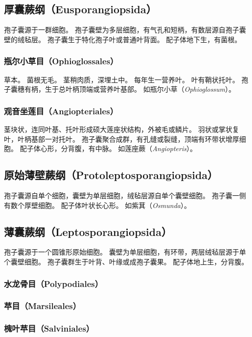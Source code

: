 \documentclass[11pt]{article}
\begin{document}
\begin{sloppypar}
\subsection{厚囊蕨纲（Eusporangiopsida）}
孢子囊源于一群细胞。
孢子囊壁为多层细胞，有气孔和短柄，有数层源自孢子囊壁的绒毡层。
孢子囊生于特化孢子叶或普通叶背面。
配子体地下生，有菌根。

\subsubsection{瓶尔小草目（Ophioglossales）}
草本。
菌根无毛。
茎稍肉质，深埋土中。
每年生一营养叶。
叶有鞘状托叶。
孢子囊穗有柄，生于总叶柄顶端或营养叶基部。
如瓶尔小草（\textit{Ophioglossum}）。

\subsubsection{观音坐莲目（Angiopteriales）}
茎块状，连同叶基、托叶形成硕大莲座状结构，外被毛或鳞片。
羽状或掌状复叶，叶柄基部一对托叶。
孢子囊聚合成群，有孔缝或裂缝，顶端有环带状增厚细胞。
配子体心形，分背腹，有中脉。
如莲座蕨（\textit{Angiopteris}）。

\subsection{原始薄壁蕨纲（Protoleptosporangiopsida）}
孢子囊源自单个细胞，囊壁为单层细胞，绒毡层源自单个囊壁细胞。
孢子囊一侧有数个厚壁细胞。
配子体叶状长心形。
如紫萁（\textit{Osmunda}）。

\subsection{薄囊蕨纲（Leptosporangiopsida）}
孢子囊源于一个圆锥形原始细胞。
囊壁为单层细胞，有环带，两层绒毡层源于单个囊壁细胞。
孢子囊群生于叶背、叶缘或成孢子囊果。
配子体地上生，分背腹。

\subsubsection{水龙骨目（Polypodiales）}
\subsubsection{苹目（Marsileales）}
\subsubsection{槐叶苹目（Salviniales）}

\end{sloppypar}
\end{document}
